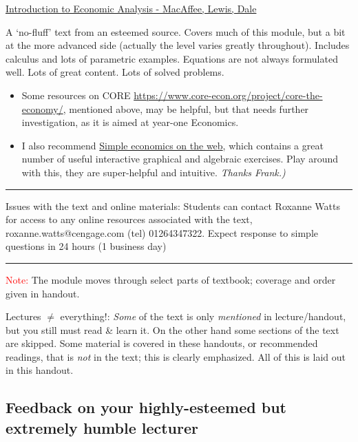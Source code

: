 \documentclass[]{article}
\begin{document}
\href{https://www.kellogg.northwestern.edu/faculty/dale/ieav21.pdf}{Introduction
to Economic Analysis - MacAffee, Lewis, Dale}

A `no-fluff' text from an esteemed source. Covers much of this module,
but a bit at the more advanced side (actually the level varies greatly
throughout). Includes calculus and lots of parametric examples.
Equations are not always formulated well. Lots of great content. Lots of
solved problems.

\bigskip

\begin{itemize}
\item
  Some resources on CORE
  \url{https://www.core-econ.org/project/core-the-economy/}, mentioned
  above, may be helpful, but that needs further investigation, as it is
  aimed at year-one Economics.
\item
  I also recommend \href{http://web.mit.edu/11.203/www/econ/}{Simple
  economics on the web}, which contains a great number of useful
  interactive graphical and algebraic exercises. Play around with this,
  they are super-helpful and intuitive. \emph{Thanks Frank.)}
\end{itemize}

\begin{center}\rule{0.5\linewidth}{\linethickness}\end{center}

Issues with the text and online materials: Students can contact Roxanne
Watts for access to any online resources associated with the text,
roxanne.watts@cengage.com (tel) 01264347322. Expect response to simple
questions in 24 hours (1 business day)

\begin{center}\rule{0.5\linewidth}{\linethickness}\end{center}

\textcolor{red}{Note:} The module moves through select parts of
textbook; coverage and order given in handout.

Lectures \(\neq\) everything!: \emph{Some} of the text is only
\emph{mentioned} in lecture/handout, but you still must read \& learn
it. On the other hand some sections of the text are skipped. Some
material is covered in these handouts, or recommended readings, that is
\emph{not} in the text; this is clearly emphasized. All of this is laid
out in this handout.

\hypertarget{feedback-on-your-highly-esteemed-but-extremely-humble-lecturer}{%
\subsection{Feedback on your highly-esteemed but extremely humble
lecturer}\label{feedback-on-your-highly-esteemed-but-extremely-humble-lecturer}}
\end{document}
